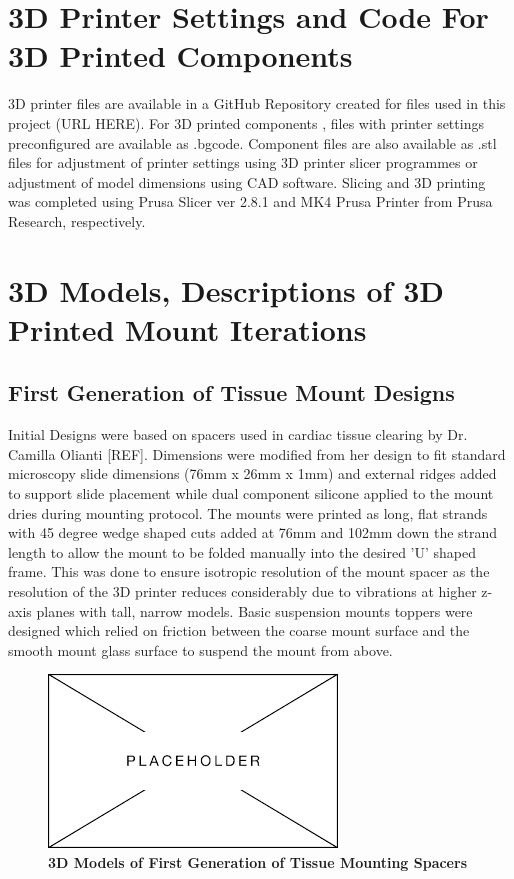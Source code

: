 \section{3D Printer Settings and Code For 3D Printed Components}

3D printer files are available in a GitHub Repository created for files used in this project (URL HERE). For 3D printed components , files with printer settings preconfigured are available as .bgcode. Component files are also available as .stl files for adjustment of printer settings using 3D printer slicer programmes or adjustment of model dimensions using CAD software. Slicing and 3D printing was completed using Prusa Slicer ver 2.8.1 and MK4 Prusa Printer from Prusa Research, respectively.

\section{3D Models, Descriptions of 3D Printed Mount Iterations}
\subsection{First Generation of Tissue Mount Designs}

Initial Designs were based on spacers used in cardiac tissue clearing by Dr. Camilla Olianti [REF]. Dimensions were modified from her design to fit standard microscopy slide dimensions (76mm x 26mm x 1mm) and external ridges added to support slide placement while dual component silicone applied to the mount dries during mounting protocol. The mounts were printed as long, flat strands with 45 degree wedge shaped cuts added at 76mm and 102mm down the strand length to allow the mount to be folded manually into the desired 'U' shaped frame. This was done to ensure isotropic resolution of the mount spacer as the resolution of the 3D printer reduces considerably due to vibrations at higher z-axis planes with tall, narrow models. Basic suspension mounts toppers were designed which relied on friction between the coarse mount surface and the smooth mount glass surface to suspend the mount from above.


\begin{figure}[H]
        \centering
        \includegraphics[width=1\linewidth]{Figures/Placeholder.png}
        \caption{\textbf{3D Models of First Generation of Tissue Mounting Spacers}}
        \label{fig:enter-label}
    \end{figure}
